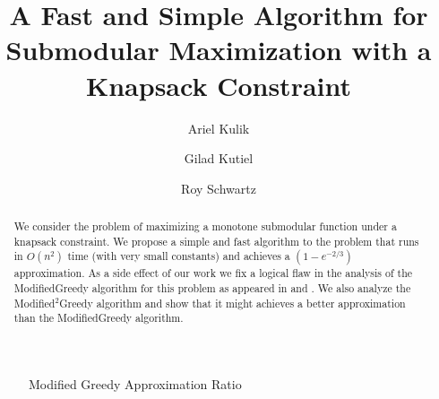 \documentclass[a4paper,UKenglish,cleveref, autoref]{lipics-v2019}
\title{A Fast and Simple Algorithm for Submodular Maximization with a Knapsack Constraint}
\author{Ariel Kulik}{Department of Computer Science, Technion, Haifa, Israel}{gkutiel@cs.technion.ac.il}{}{}
\author{Gilad Kutiel}{Department of Computer Science, Technion, Haifa, Israel}{arielk@cs.technion.ac.il}{}{}
\author{Roy Schwartz}{Department of Computer Science, Technion, Haifa, Israel}{roy@cs.technion.ac.il}{}{}
\begin{document}
\maketitle

\begin{abstract}
    We consider the problem of maximizing a monotone submodular function under a knapsack constraint.
    We propose a simple and fast algorithm to the problem that runs in $O(n^2)$ time (with very small constants) and achieves a $(1-e^{-2/3})$ approximation.
    As a side effect of our work we fix a logical flaw in the analysis of the ModifiedGreedy algorithm for this problem as appeared in \cite{khuller1999budgeted} and \cite{krause2005note}.
    We also analyze the Modified$^2$Greedy algorithm and show that it might achieves a better approximation than the ModifiedGreedy algorithm.
\end{abstract}






\appendix

\begin{figure}[H]
	\caption{
		\label{fig:mgreedy}
		Modified Greedy Approximation Ratio
	}
\end{figure}
\end{document}

